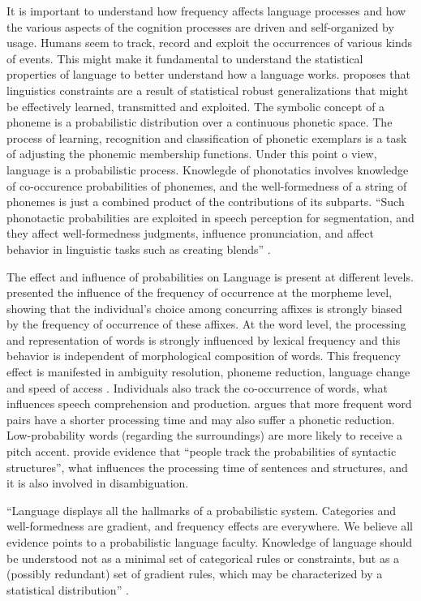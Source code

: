 It is important to understand how frequency affects language processes and how the various
aspects of the cognition processes are driven and self-organized by usage.  
Humans seem to track, record and exploit the occurrences of various kinds of events.
This might make it fundamental to understand the statistical properties of language
to better understand how a language works.
\cite{pierrehumbert2003} proposes that linguistics constraints are a result of statistical robust generalizations
that might be effectively learned, transmitted and exploited.
The symbolic concept of a phoneme is a probabilistic distribution over a continuous phonetic space.
The process of learning, recognition and classification of phonetic exemplars is a task
of adjusting the phonemic membership functions. Under this point o view, language is a probabilistic process.
Knowlegde of phonotatics involves knowledge of co-occurence probabilities of phonemes, and the well-formedness
of a string of phonemes is just a combined product of the contributions of its subparts.
``Such phonotactic probabilities are exploited in speech perception for segmentation,
and they affect well-formedness judgments, influence pronunciation, and
affect behavior in linguistic tasks such as creating blends'' \citep{bod2003}.

The effect and influence of probabilities on Language is present at different levels.
\cite{baayen2003} presented the influence of the frequency of occurrence at the morpheme level,
showing that the individual's choice among concurring affixes is strongly biased by the frequency
of occurrence of these affixes. At the word level, the processing and representation of words
is strongly influenced by lexical frequency and this behavior is independent of morphological
composition of words. This frequency effect is manifested in ambiguity resolution,
phoneme reduction, language change and speed of access \citep{bod2003}.
Individuals also track the co-occurrence of words, what influences speech comprehension 
and production. \cite{jurafsky2003} argues that more frequent word pairs have a shorter processing time and
may also suffer a phonetic reduction. Low-probability words (regarding the surroundings)
are more likely to receive a pitch accent. \cite{jurafsky2003} provide evidence that 
``people track the probabilities of syntactic structures'', what influences the processing time
of sentences and structures, and it is also involved in disambiguation.

``Language displays all the hallmarks of a probabilistic system. Categories
and well-formedness are gradient, and frequency effects are everywhere.
We believe all evidence points to a probabilistic language faculty.
Knowledge of language should be understood not as a minimal set of
categorical rules or constraints, but as a (possibly redundant) set of gradient 
rules, which may be characterized by a statistical distribution'' \citep{bod2003}.

